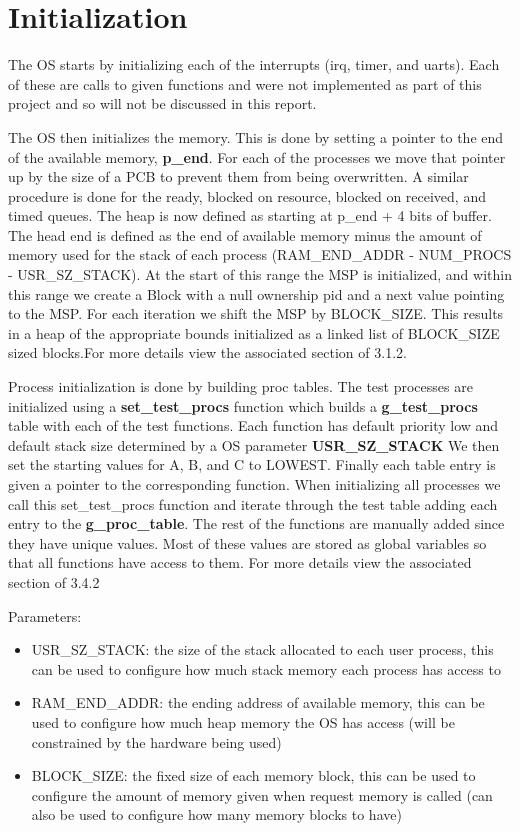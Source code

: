 \documentclass[11pt, oneside]{article}
\begin{document}
\clearpage

\section{Initialization}
The OS starts by initializing each of the interrupts (irq, timer, and uarts). Each of these are calls to given functions and were not implemented as part of this project and so will not be discussed in this report.

The OS then initializes the memory. This is done by setting a pointer to the end of the available memory, \textbf{p\_end}. For each of the processes we move that pointer up by the size of a PCB to prevent them from being overwritten. A similar procedure is done for the ready, blocked on resource, blocked on received, and timed queues. The heap is now defined as starting at p\_end + 4 bits of buffer. The head end is defined as the end of available memory minus the amount of memory used for the stack of each process (RAM\_END\_ADDR - NUM\_PROCS - USR\_SZ\_STACK). At the start of this range the MSP is initialized, and within this range we create a Block with a null ownership pid and a next value pointing to the MSP. For each iteration we shift the MSP by BLOCK\_SIZE. This results in a heap of the appropriate bounds initialized as a linked list of BLOCK\_SIZE sized blocks.For more details view the associated section of 3.1.2.

Process initialization is done by building proc tables. The test processes are initialized using a \textbf{set\_test\_procs} function which builds a \textbf{g\_test\_procs} table with each of the test functions. Each function has default priority low and default stack size determined by a OS parameter \textbf{USR\_SZ\_STACK} We then set the starting values for A, B, and C to LOWEST. Finally each table entry is given a pointer to the corresponding function. When initializing all processes we call this set\_test\_procs function and iterate through the test table adding each entry to the \textbf{g\_proc\_table}. The rest of the functions are manually added since they have unique values. Most of these values are stored as global variables so that all functions have access to them. For more details view the associated section of 3.4.2

Parameters:
\begin{itemize}
    \item USR\_SZ\_STACK: the size of the stack allocated to each user process, this can be used to configure how much stack memory each process has access to
    \item RAM\_END\_ADDR: the ending address of available memory, this can be used to configure how much heap memory the OS has access (will be constrained by the hardware being used)
    \item BLOCK\_SIZE: the fixed size of each memory block, this can be used to configure the amount of memory given when request memory is called (can also be used to configure how many memory blocks to have)
\end{itemize}
\end{document}
